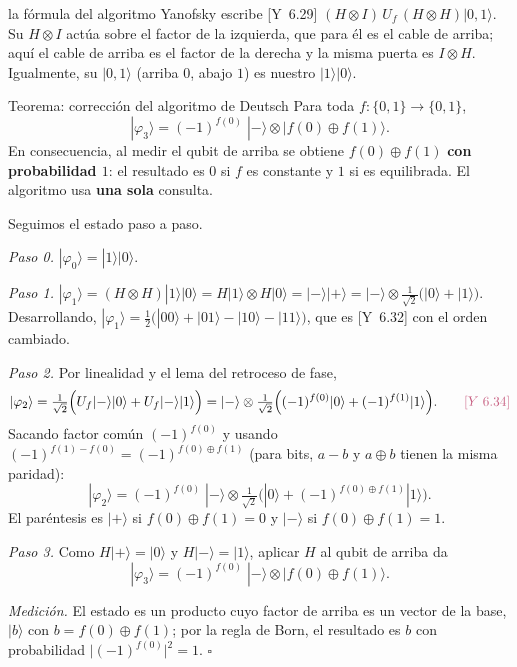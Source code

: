 \documentclass[11pt, a4paper, twoside, openright]{report}
\providecommand{\ket}[1]{|#1\rangle}
\newcommand{\Yan}[1]{\textcolor{rosaviejo}{\small[Y~#1]}}  %
\begin{document}
\begin{convencion}{la fórmula del algoritmo}
Yanofsky escribe \Yan{6.29} $(H\otimes I)\,U_f\,(H\otimes H)\ket{0,1}$. Su $H\otimes I$ actúa sobre el factor de la izquierda, que para él es el cable de arriba; aquí el cable de arriba es el factor de la derecha y la misma puerta es $I\otimes H$. Igualmente, su $\ket{0,1}$ (arriba $0$, abajo $1$) es nuestro $\ket{1}\ket{0}$.
\end{convencion}

\begin{teoria}{Teorema: corrección del algoritmo de Deutsch}
Para toda $f:\{0,1\}\to\{0,1\}$,
\[ \ket{\varphi_3} = (-1)^{f(0)}\;\ket{-}\otimes\ket{f(0)\oplus f(1)}. \]
En consecuencia, al medir el qubit de arriba se obtiene $f(0)\oplus f(1)$ \textbf{con probabilidad $1$}: el resultado es $0$ si $f$ es constante y $1$ si es equilibrada. El algoritmo usa \textbf{una sola} consulta.
\end{teoria}

\begin{demo}
Seguimos el estado paso a paso.

\textit{Paso 0.} $\ket{\varphi_0} = \ket{1}\ket{0}$.

\textit{Paso 1.} $\ket{\varphi_1} = (H\otimes H)\ket{1}\ket{0} = H\ket{1}\otimes H\ket{0} = \ket{-}\ket{+} = \ket{-}\otimes\frac{1}{\sqrt2}\big(\ket{0}+\ket{1}\big)$. Desarrollando, $\ket{\varphi_1} = \frac12\big(\ket{00}+\ket{01}-\ket{10}-\ket{11}\big)$, que es \Yan{6.32} con el orden cambiado.

\textit{Paso 2.} Por linealidad y el lema del retroceso de fase,
\[ \ket{\varphi_2} = \tfrac{1}{\sqrt2}\Big(U_f\ket{-}\ket{0} + U_f\ket{-}\ket{1}\Big) = \ket{-}\otimes\tfrac{1}{\sqrt2}\Big((-1)^{f(0)}\ket{0} + (-1)^{f(1)}\ket{1}\Big). \qquad \Yan{6.34} \]
Sacando factor común $(-1)^{f(0)}$ y usando $(-1)^{f(1)-f(0)} = (-1)^{f(0)\oplus f(1)}$ (para bits, $a - b$ y $a\oplus b$ tienen la misma paridad):
\[ \ket{\varphi_2} = (-1)^{f(0)}\;\ket{-}\otimes\tfrac{1}{\sqrt2}\Big(\ket{0} + (-1)^{f(0)\oplus f(1)}\ket{1}\Big). \]
El paréntesis es $\ket{+}$ si $f(0)\oplus f(1) = 0$ y $\ket{-}$ si $f(0)\oplus f(1) = 1$.

\textit{Paso 3.} Como $H\ket{+} = \ket{0}$ y $H\ket{-} = \ket{1}$, aplicar $H$ al qubit de arriba da
\[ \ket{\varphi_3} = (-1)^{f(0)}\;\ket{-}\otimes\ket{f(0)\oplus f(1)}. \]

\textit{Medición.} El estado es un producto cuyo factor de arriba es un vector de la base, $\ket{b}$ con $b = f(0)\oplus f(1)$; por la regla de Born, el resultado es $b$ con probabilidad $\big|(-1)^{f(0)}\big|^2 = 1$. \hfill$\square$
\end{demo}
\end{document}
